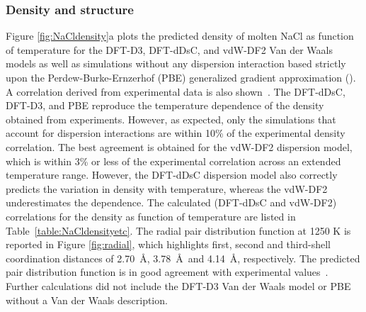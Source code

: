 \documentclass[preprint,3p,10pt,onecolumn,number,sort&compress]{elsarticle}
\begin{document}
{\subsubsection{Density and structure}
Figure \ref{fig:NaCldensity}a plots the predicted density of molten NaCl as function of temperature for the DFT-D3, DFT-dDsC, and vdW-DF2 Van der Waals models as well as simulations without any dispersion interaction based strictly upon the Perdew-Burke-Ernzerhof (PBE) generalized gradient approximation (\cite{pbe}). A correlation derived from experimental data is also shown~\cite{Janz1988}. The DFT-dDsC, DFT-D3, and PBE reproduce the temperature dependence of the density obtained from experiments. However, as expected, only the simulations that account for dispersion interactions are within 10\% of the experimental density correlation. The best agreement is obtained for the vdW-DF2 dispersion model, which is within 3\% or less of the experimental correlation across an extended temperature range. However, the DFT-dDsC dispersion model also correctly predicts the variation in density with temperature, whereas the vdW-DF2 underestimates the dependence. The calculated (DFT-dDsC and vdW-DF2) correlations for the density as function of temperature are listed in Table~\ref{table:NaCldensityetc}. The radial pair distribution function at 1250 K is reported in Figure \ref{fig:radial}, which highlights first, second and third-shell coordination distances of 2.70~\AA, 3.78~\AA~and 4.14~\AA, respectively. The predicted pair distribution function is in good agreement with experimental values~\cite{Edwards_1975}. Further calculations did not include the DFT-D3 Van der Waals model or PBE without a Van der Waals description.


}
\end{document}
